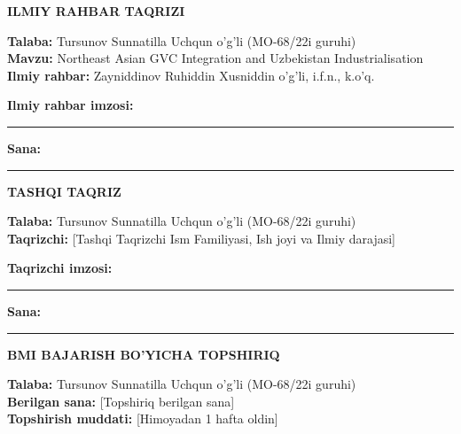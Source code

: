 
\newpage
\thispagestyle{empty}
\begin{center}
 {\large\bfseries ILMIY RAHBAR TAQRIZI}\\[1em]
\end{center}
\noindent\textbf{Talaba:} Tursunov Sunnatilla Uchqun o'g'li (MO-68/22i guruhi)\\
\textbf{Mavzu:} Northeast Asian GVC Integration and Uzbekistan Industrialisation\\
\textbf{Ilmiy rahbar:} Zayniddinov Ruhiddin Xusniddin o'g'li, i.f.n., k.o'q.\\

\vspace{1em}

\vspace{3cm}
\noindent
\textbf{Ilmiy rahbar imzosi:} \rule{4cm}{0.4pt} \hfill \textbf{Sana:} \rule{3cm}{0.4pt}

\newpage
\thispagestyle{empty}
\begin{center}
 {\large\bfseries TASHQI TAQRIZ}\\[1em]
\end{center}
\noindent\textbf{Talaba:} Tursunov Sunnatilla Uchqun o'g'li (MO-68/22i guruhi)\\
\textbf{Taqrizchi:} [Tashqi Taqrizchi Ism Familiyasi, Ish joyi va Ilmiy darajasi]\\

\vspace{1em}

\vspace{3cm}
\noindent
\textbf{Taqrizchi imzosi:} \rule{4cm}{0.4pt} \hfill \textbf{Sana:} \rule{3cm}{0.4pt}

\newpage
\thispagestyle{empty}
\begin{center}
 {\large\bfseries BMI BAJARISH BO'YICHA TOPSHIRIQ}\\[1em]
\end{center}
\noindent\textbf{Talaba:} Tursunov Sunnatilla Uchqun o'g'li (MO-68/22i guruhi)\\
\textbf{Berilgan sana:} [Topshiriq berilgan sana]\\
\textbf{Topshirish muddati:} [Himoyadan 1 hafta oldin]\\

